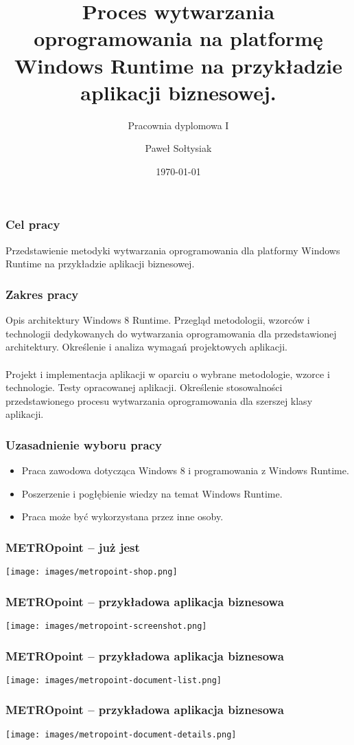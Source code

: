 \documentclass{beamer}
\title{Proces wytwarzania oprogramowania na platformę Windows Runtime na przykładzie aplikacji biznesowej.}
\subtitle{Pracownia dyplomowa I}
\author{Paweł Sołtysiak}
\institute{Opiekun pracy: dr inż.  Witold Maćków\\Kierownik Katedry: prof. dr hab. inż. Włodzimierz Bielecki}
\date{\today}
\begin{document}
\begin{frame}
\titlepage
\end{frame} 


\begin{frame}
\frametitle{Cel pracy} 
Przedstawienie metodyki wytwarzania oprogramowania dla platformy Windows Runtime na przykładzie  aplikacji biznesowej.
\end{frame}

\begin{frame}
\frametitle{Zakres pracy} 
Opis architektury Windows 8 Runtime. Przegląd metodologii, wzorców i technologii dedykowanych do wytwarzania oprogramowania dla przedstawionej architektury. Określenie i analiza wymagań projektowych aplikacji.\\
~\\
Projekt i implementacja aplikacji w oparciu o wybrane metodologie, wzorce i technologie. Testy opracowanej aplikacji. Określenie stosowalności przedstawionego procesu wytwarzania oprogramowania dla szerszej klasy aplikacji.
\end{frame}


\begin{frame}
\frametitle{Uzasadnienie wyboru pracy} 
\begin{itemize}[<+->]
\item Praca zawodowa dotycząca Windows 8 i programowania z Windows Runtime.
\item Poszerzenie i pogłębienie wiedzy na temat Windows Runtime.
\item Praca może być wykorzystana przez inne osoby.
\end{itemize}
\end{frame}

\begin{frame}
\frametitle{\textbf{METRO}point -- już jest}
 \texttt{[image: images/metropoint-shop.png]}
\end{frame}

\begin{frame}
\frametitle{\textbf{METRO}point -- przykładowa aplikacja biznesowa}
 \texttt{[image: images/metropoint-screenshot.png]}
\end{frame}

\begin{frame}
\frametitle{\textbf{METRO}point -- przykładowa aplikacja biznesowa}
 \texttt{[image: images/metropoint-document-list.png]}
\end{frame}

\begin{frame}
\frametitle{\textbf{METRO}point -- przykładowa aplikacja biznesowa}
 \texttt{[image: images/metropoint-document-details.png]}
\end{frame}
\end{document}
